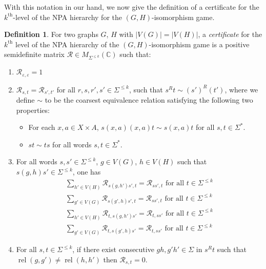 \documentclass[11pt,a4paper]{article}
\theoremstyle{plain}
\theoremstyle{remark}
\theoremstyle{definition}
\newtheorem{definition}[thm]{Definition}
\DeclareMathOperator{\rel}{rel}
\newcommand{\card}[1]{\left\lvert #1 \right\rvert}
\renewcommand\epsilon\varepsilon
\begin{document}
With this notation in our hand, we now give the definition of a certificate for the $k^{\text{th}}$-level of the NPA hierarchy for the $(G, H)$-isomorphism game.




\begin{definition}\label{def:cert-npa}
    For two graphs $G$, $H$ with $\card{V(G)} = \card{V(H)}$, a \emph{certificate} for the $k^{\text{th}}$ level of the NPA hierarchy of the $(G,H)$-isomorphism game is a positive semidefinite matrix $\mathcal{R} \in M_{\Sigma^{\leq k}}(\mathbb{C})$ such that: 
    \begin{enumerate}[label = (\roman*)]\label{eq:npa-for-graph-iso}
        \item \label{qiso-item-1}$\mathcal{R}_{\epsilon, \epsilon} = 1$
        \item \label{qiso-item-2} $\mathcal{R}_{s,t} = \mathcal{R}_{s',t'}$ for all $r,s,r',s' \in \Sigma^{\leq k}$, such that $s^Rt \sim (s')^R(t')$, where  we define $\sim$ to be the coarsest equivalence relation satisfying the following two properties:
\begin{itemize}
    \item For each $x,a \in X \times A$, $s(x,a)(x,a)t \sim s(x,a)t$ for all $s,t \in \Sigma^*$.
    \item $st \sim ts$ for all words $s,t \in \Sigma^*$.
\end{itemize} \item \label{qiso-item-3} For all words $s,s' \in \Sigma^{\leq k}$, $g\in V(G)$, $h \in V(H)$ such that $s(g,h)s' \in \Sigma^{\leq k}$, one has 
        \begin{align}
            \sum_{h' \in V(H)} \mathcal{R}_{s(g,h')s', t} = \mathcal{R}_{ss', t} \text{ for all } t\in \Sigma^{\leq k}\label{eq:qiso31}\\
            \sum_{g' \in V(G)} \mathcal{R}_{s(g',h)s', t} = \mathcal{R}_{ss', t} \text{ for all } t\in \Sigma^{\leq k}\\
            \sum_{h' \in V(H)} \mathcal{R}_{t, s(g,h')s'} = \mathcal{R}_{t, ss'} \text{ for all } t\in \Sigma^{\leq k}\\
            \sum_{g' \in V(G)} \mathcal{R}_{t, s(g',h)s'} = \mathcal{R}_{t, ss'} \text{ for all } t\in \Sigma^{\leq k}
        \end{align}
\item \label{qiso-item-4} For all $s, t \in\Sigma^{\leq k}$, if there exist consecutive $gh, g'h' \in \Sigma$ in $s^Rt$ such that $\rel(g,g') \neq \rel(h,h')$ then $\mathcal{R}_{s, t} = 0$. 
\end{enumerate}
\end{definition}
\end{document}
